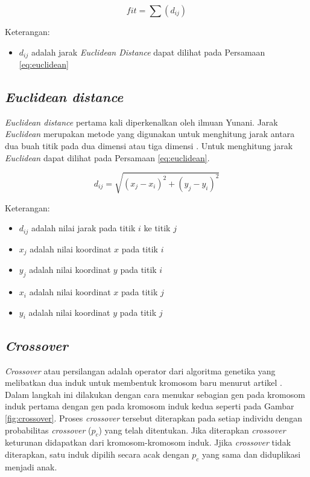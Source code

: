 	\begin{equation}
    fit=\sum (d_{ij})
    \label{eq:fitness}
    \end{equation}
    
    Keterangan:
    \begin{itemize}
	\item $d_{ij}$ adalah jarak \textit{Euclidean Distance} dapat dilihat pada Persamaan \ref{eq:euclidean}
    \end{itemize}
	
\subsection{\textit{Euclidean distance}}

\textit{Euclidean distance} pertama kali diperkenalkan oleh ilmuan Yunani. Jarak \textit{Euclidean} merupakan metode yang digunakan untuk menghitung jarak antara dua buah titik pada dua dimensi atau tiga dimensi \cite{widodo2018penerapan}. Untuk menghitung jarak \textit{Euclidean} dapat dilihat pada Persamaan \ref{eq:euclidean}.
       
    \begin{equation}
	d_{ij}=\sqrt{\left( x_j-x_i \right)^{2}+\left( y_j-y_i \right)^{2}}
	\label{eq:euclidean}
	\end{equation}
	
	Keterangan:
	\begin{itemize}
	\item $d_{ij}$ adalah nilai jarak pada titik $i$ ke titik $j$
	\item $x_j$ adalah nilai koordinat $x$ pada titik $i$
	\item $y_j$ adalah nilai koordinat $y$ pada titik $i$
	\item $x_i$ adalah nilai koordinat $x$ pada titik $j$
	\item $y_i$ adalah nilai koordinat $y$ pada titik $j$
	\end{itemize}

\subsection{\textit{Crossover}}
\textit{Crossover} atau persilangan adalah operator dari algoritma genetika yang melibatkan dua induk untuk membentuk kromosom baru menurut artikel \cite{hardi2014analisis}. Dalam langkah ini dilakukan dengan cara menukar sebagian gen pada kromosom induk pertama dengan gen pada kromosom induk kedua seperti pada Gambar \ref{fig:crossover}. Proses \textit{crossover} tersebut diterapkan pada setiap individu dengan probabilitas \textit{crossover} ($p_c$) yang telah ditentukan. Jika diterapkan \textit{crossover} keturunan didapatkan dari kromosom-kromosom induk. Jjika \textit{crossover} tidak diterapkan, satu induk dipilih secara acak dengan $p_c$ yang sama dan diduplikasi menjadi anak.

